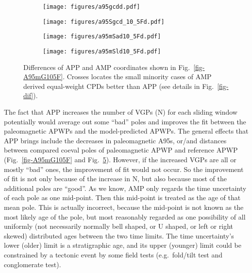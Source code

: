 \begin{figure}
\captionsetup[subfigure]{singlelinecheck=off,justification=raggedright,aboveskip=-6pt,belowskip=-6pt}
\centering
  \begin{subfigure}[htbp]{.49\textwidth}
	\caption{}\texttt{[image: figures/a95gcdd.pdf]}\label{fig-A95GCD105Fd}
  \end{subfigure}
  \begin{subfigure}[htbp]{.49\textwidth}
	\caption{}\texttt{[image: figures/a95Sgcd\_10\_5Fd.pdf]}\label{fig-A95SGCD105Fd}
  \end{subfigure}
  \begin{subfigure}[htbp]{.49\textwidth}
	\caption{}\texttt{[image: figures/a95mSad10\_5Fd.pdf]}\label{fig-A95mSad105Fd}
  \end{subfigure}
  \begin{subfigure}[htbp]{.49\textwidth}
	\caption{}\texttt{[image: figures/a95mSld10\_5Fd.pdf]}\label{fig-A95mSld105Fd}
  \end{subfigure}
\caption[APP spatially better than AMP]{Differences of APP and AMP coordinates
shown in Fig.~\ref{fig-A95mG105F}. Crosses locates the small minority cases of
AMP derived equal-weight CPDs better than APP (see details in
Fig.~\ref{fig-dif}).}\label{fig-A95mG105Fd}
\end{figure}

The fact that APP increases the number of VGPs (N) for each sliding window
potentially would average out some ``bad'' poles and improves the fit between
the paleomagnetic APWPs and the model-predicted APWPs. The general effects that
APP brings include the decreases in paleomagnetic A95s, or/and distances
between compared coeval poles of paleomagnetic APWP and reference APWP
(Fig.~\ref{fig-A95mG105F} and Fig.~\ref{fig-A95mG105Fd}). However, if the
increased VGPs are all or mostly ``bad'' ones, the improvement of fit would not
occur. So the improvement of fit is not only because of the increase in N, but
also because most of the additional poles are ``good''. As we know, AMP only
regards the time uncertainty of each pole as one mid-point. Then this mid-point
is treated as the age of that mean pole. This is actually incorrect, because the
mid-point is not known as the most likely age of the pole, but most reasonably
regarded as one possibility of all uniformly (not necessarily normally bell
shaped, or U shaped, or left or right skewed) distributed ages between the two
time limits. The time uncertainty's lower (older) limit is a stratigraphic age,
and its upper (younger) limit could be constrained by a tectonic event by some
field tests (e.g.\ fold/tilt test and conglomerate test).

